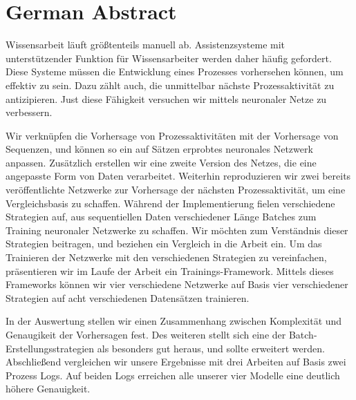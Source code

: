 \chapter*{German Abstract}
Wissensarbeit läuft größtenteils manuell ab.
Assistenzsysteme mit unterstützender Funktion für Wissensarbeiter werden daher häufig gefordert.
Diese Systeme müssen die Entwicklung eines Prozesses vorhersehen können, um effektiv zu sein.
Dazu zählt auch, die unmittelbar nächste Prozessaktivität zu antizipieren.
Just diese Fähigkeit versuchen wir mittels neuronaler Netze zu verbessern.

Wir verknüpfen die Vorhersage von Prozessaktivitäten mit der Vorhersage von Sequenzen, und können so ein auf Sätzen erprobtes neuronales Netzwerk anpassen.
Zusätzlich erstellen wir eine zweite Version des Netzes, die eine angepasste Form von Daten verarbeitet.
Weiterhin reproduzieren wir zwei bereits veröffentlichte Netzwerke zur Vorhersage der nächsten Prozessaktivität, um eine Vergleichsbasis zu schaffen.
Während der Implementierung fielen verschiedene Strategien auf, aus sequentiellen Daten verschiedener Länge Batches zum Training neuronaler Netzwerke zu schaffen.
Wir möchten zum Verständnis dieser Strategien beitragen, und beziehen ein Vergleich in die Arbeit ein.
Um das Trainieren der Netzwerke mit den verschiedenen Strategien zu vereinfachen, präsentieren wir im Laufe der Arbeit ein Trainings-Framework.
Mittels dieses Frameworks können wir vier verschiedene Netzwerke auf Basis vier verschiedener Strategien auf acht verschiedenen Datensätzen trainieren.

In der Auswertung stellen wir einen Zusammenhang zwischen Komplexität und Genaugikeit der Vorhersagen fest.
Des weiteren stellt sich eine der Batch-Erstellungsstrategien als besonders gut heraus, und sollte erweitert werden.
Abschließend vergleichen wir unsere Ergebnisse mit drei Arbeiten auf Basis zwei Prozess Logs.
Auf beiden Logs erreichen alle unserer vier Modelle eine deutlich höhere Genauigkeit.

\endgroup

\vfill
